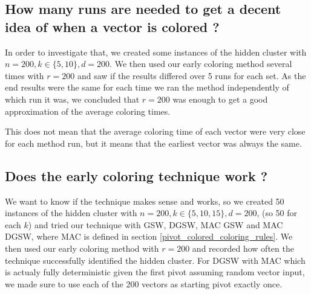 \documentclass[12pt]{article}
\begin{document}
\subsection{How many runs are needed to get a decent idea of when a vector is colored ?}
In order to investigate that, we created some instances of the hidden cluster with $n=200,k\in\{5,10\},d=200$. We then used our early coloring method several times with $r=200$ and saw if the results differed over 5 runs for each set. As the end results were the same for each time we ran the method independently of which run it was, we concluded that $r=200$ was enough to get a good approximation of the average coloring times. 

This does not mean that the average coloring time of each vector were very close for each method run, but it means that the earliest vector was always the same.

\subsection{Does the early coloring technique work ?}
We want to know if the technique makes sense and works, so we created 50 instances of the hidden cluster with $n=200,k\in\{5,10,15\},d=200$, (so 50 for each $k$) and tried our technique with GSW, DGSW, MAC GSW and MAC DGSW, where MAC is defined in section \ref{pivot_colored_coloring_rules}. We then used our early coloring method with $r=200$ and recorded how often the technique successfully identified the hidden cluster. For DGSW with MAC which is actualy fully deterministic given the first pivot assuming random vector input, we made sure to use each of the 200 vectors as starting pivot exactly once.
\end{document}

